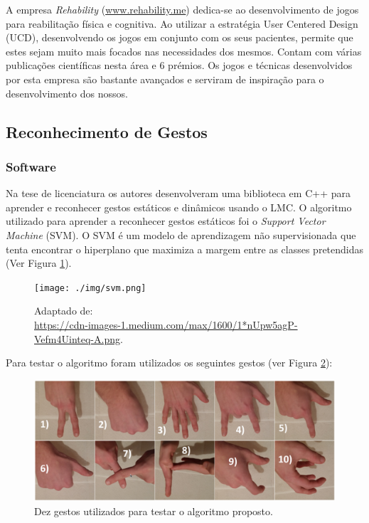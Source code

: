 \documentclass{TTUPhD}
\begin{document}
A empresa \textit{Rehability} (\url{www.rehability.me}) dedica-se ao desenvolvimento de jogos para reabilitação física e cognitiva.
Ao utilizar a estratégia User Centered Design (UCD), desenvolvendo os jogos em conjunto com os seus pacientes, permite que estes sejam muito
mais focados nas necessidades dos mesmos. Contam com várias publicações científicas nesta área e 6 prémios.
Os jogos e técnicas desenvolvidos por esta empresa são bastante avançados e serviram de inspiração para o desenvolvimento dos nossos.

\subsection{Reconhecimento de Gestos}

\subsubsection{Software}

Na tese de licenciatura \cite{poznan} os autores desenvolveram uma biblioteca em C++ para aprender e reconhecer gestos estáticos e dinâmicos usando o LMC.
O algoritmo utilizado para aprender a reconhecer gestos estáticos foi o \textit{Support Vector Machine} (SVM).
O SVM é um modelo de aprendizagem não supervisionada que tenta encontrar o hiperplano que maximiza a margem entre as classes pretendidas (Ver Figura \ref{fig:svm}).

\begin{figure}[h!]
    \center
    \texttt{[image: ./img/svm.png]}
    \caption{Adaptado de: \\ \url{https://cdn-images-1.medium.com/max/1600/1*nUpw5agP-Vefm4Uinteq-A.png}.}
    \label{fig:svm}
\end{figure}

Para testar o algoritmo foram utilizados os seguintes gestos (ver Figura \ref{fig:10_gestures}):

\begin{figure}[h!]
    \center
    \includegraphics[scale=0.25]{./img/10_gestures.png}
    \caption{Dez gestos utilizados para testar o algoritmo proposto.}
    \label{fig:10_gestures}
\end{figure}
\end{document}
